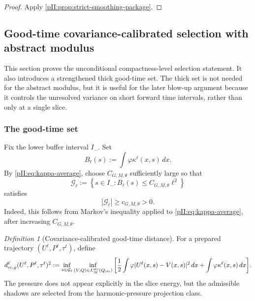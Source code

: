 \documentclass[11pt]{article}
\numberwithin{equation}{section}
\theoremstyle{plain}
\theoremstyle{definition}
\theoremstyle{remark}
\newtheorem{definition}{Definition}[section]
\newcommand{\str}{\mathrm{str}}
\newcommand{\cc}{\mathrm{cc}}
\newcommand{\dx}{\,dx}
\begin{document}
\begin{proof}
Apply \cref{pII:prop:strict-smoothing-package}.
\end{proof}

\subsection{Good-time covariance-calibrated selection with abstract modulus}\label{pII:sec:abstract-selection}

This section proves the unconditional compactness-level selection statement.  It also introduces a strengthened thick good-time set.  The thick set is not needed for the abstract modulus, but it is useful for the later blow-up argument because it controls the unresolved variance on short forward time intervals, rather than only at a single slice.

\subsubsection{The good-time set}

Fix the lower buffer interval $I_-$.  Set
\[
        B_\ell(s):=\int \varphi\kappa^\ell(x,s)\dx .
\]
By \eqref{pII:eq:kappa-average}, choose $C_{G,M,\theta}$ sufficiently large so that
\begin{equation}\label{pII:eq:good-set}
        \mathcal G_\ell
        :=\left\{s\in I_-:
        B_\ell(s)\le C_{G,M,\theta}\ell^2\right\}
\end{equation}
satisfies
\begin{equation}\label{pII:eq:good-set-measure}
        |\mathcal G_\ell|\ge c_{G,M,\theta}>0.
\end{equation}
Indeed, this follows from Markov's inequality applied to \eqref{pII:eq:kappa-average}, after increasing $C_{G,M,\theta}$.

\begin{definition}[Covariance-calibrated good-time distance]\label{pII:def:cc-distance}
For a prepared trajectory $(U^\ell,P^\ell,\tau^\ell)$, define
\begin{equation}\label{pII:eq:cc-distance}
\begin{aligned}
        d^\ell_{\cc,g}(U^\ell,P^\ell,\tau^\ell)^2
        :=\inf_{s\in\mathcal G_\ell}
        \inf_{(V,Q)\in L_M^{\str}(Q_{\rm str})}
        \bigg[
        \frac12\int\varphi|U^\ell(x,s)-V(x,s)|^2\dx
        +\int\varphi\kappa^\ell(x,s)\dx
        \bigg].
\end{aligned}
\end{equation}
The pressure does not appear explicitly in the slice energy, but the admissible shadows are selected from the harmonic-pressure projection class.
\end{definition}
\end{document}
